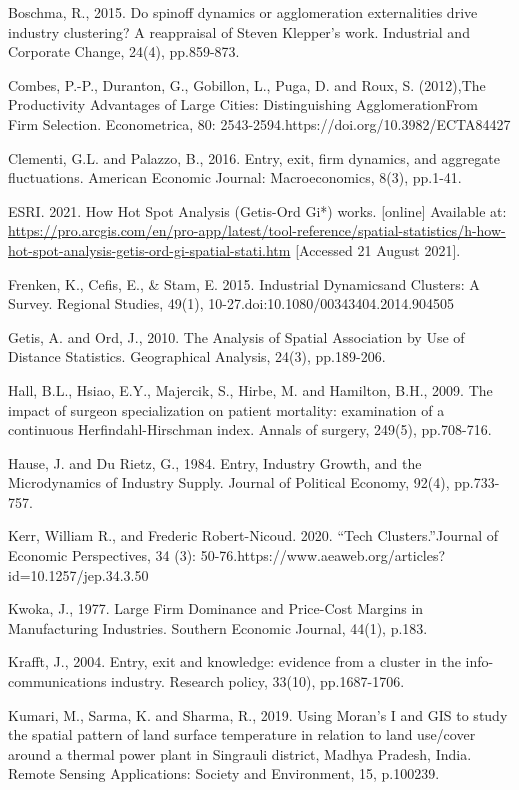 \documentclass[
  12pt,
  oneside]{book}
\begin{document}
Boschma, R., 2015. Do spinoff dynamics or agglomeration externalities drive industry clustering? A reappraisal of Steven Klepper's work. Industrial and Corporate Change, 24(4), pp.859-873.

Combes, P.-P., Duranton, G., Gobillon, L., Puga, D. and Roux, S. (2012),The Productivity Advantages of Large Cities: Distinguishing AgglomerationFrom Firm Selection. Econometrica, 80: 2543-2594.https://doi.org/10.3982/ECTA84427

Clementi, G.L. and Palazzo, B., 2016. Entry, exit, firm dynamics, and aggregate fluctuations. American Economic Journal: Macroeconomics, 8(3), pp.1-41.

ESRI. 2021. How Hot Spot Analysis (Getis-Ord Gi*) works. {[}online{]} Available at: \url{https://pro.arcgis.com/en/pro-app/latest/tool-reference/spatial-statistics/h-how-hot-spot-analysis-getis-ord-gi-spatial-stati.htm} {[}Accessed 21 August 2021{]}.

Frenken, K., Cefis, E., \& Stam, E. 2015. Industrial Dynamicsand Clusters: A Survey. Regional Studies, 49(1), 10-27.doi:10.1080/00343404.2014.904505

Getis, A. and Ord, J., 2010. The Analysis of Spatial Association by Use of Distance Statistics. Geographical Analysis, 24(3), pp.189-206.

Hall, B.L., Hsiao, E.Y., Majercik, S., Hirbe, M. and Hamilton, B.H., 2009. The impact of surgeon specialization on patient mortality: examination of a continuous Herfindahl-Hirschman index. Annals of surgery, 249(5), pp.708-716.

Hause, J. and Du Rietz, G., 1984. Entry, Industry Growth, and the Microdynamics of Industry Supply. Journal of Political Economy, 92(4), pp.733-757.

Kerr, William R., and Frederic Robert-Nicoud. 2020. ``Tech Clusters.''Journal of Economic Perspectives, 34 (3): 50-76.https://www.aeaweb.org/articles?id=10.1257/jep.34.3.50

Kwoka, J., 1977. Large Firm Dominance and Price-Cost Margins in Manufacturing Industries. Southern Economic Journal, 44(1), p.183.

Krafft, J., 2004. Entry, exit and knowledge: evidence from a cluster in the info-communications industry. Research policy, 33(10), pp.1687-1706.

Kumari, M., Sarma, K. and Sharma, R., 2019. Using Moran's I and GIS to study the spatial pattern of land surface temperature in relation to land use/cover around a thermal power plant in Singrauli district, Madhya Pradesh, India. Remote Sensing Applications: Society and Environment, 15, p.100239.
\end{document}
